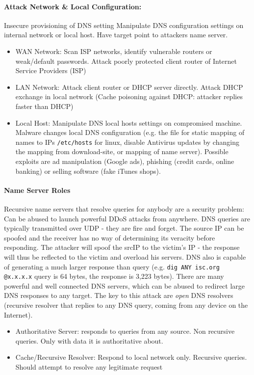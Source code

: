 \paragraph{Attack Network \& Local Configuration:} Insecure provisioning of DNS setting
Manipulate DNS configuration settings on internal network or local host. Have target point to attackers name server.
\begin{itemize}
    \item WAN Network: Scan ISP networks, identify vulnerable routers or weak/default passwords. Attack poorly protected client router of Internet Service Providers (ISP)
    \item LAN Network: Attack client router or DHCP server directly. Attack DHCP exchange in local network (Cache poisoning against DHCP: attacker replies faster than DHCP)
    \item Local Host: Manipulate DNS local hosts settings on compromised machine. Malware changes local DNS configuration (e.g. the file for static mapping of names to IPs \texttt{/etc/hosts} for linux, disable Antivirus updates by changing the mapping from download-site, or mapping of name server). Possible exploits are ad manipulation (Google ads), phishing (credit cards, online banking) or selling software (fake iTunes shops).
\end{itemize}

\paragraph{Name Server Roles}
Recursive name servers that resolve queries for anybody are a security problem:
Can be abused to launch powerful DDoS attacks from anywhere. DNS queries are typically transmitted over UDP - they are fire and forget. The source IP can be spoofed and the receiver has no way of determining its veracity before responding. The attacker will spoof the srcIP to the victim's IP - the response will thus be reflected to the victim and overload his servers. DNS also is capable of generating a much larger response than query (e.g. \texttt{dig ANY isc.org @x.x.x.x} query is 64 bytes, the response is 3,223 bytes). There are many powerful and well connected DNS servers, which can be abused to redirect large DNS responses to any target. The key to this attack are \textit{open} DNS resolvers (recursive resolver that replies to any DNS query, coming from any device
on the Internet).

\begin{itemize}
    \item Authoritative Server: responds to queries from any source. Non recursive queries. Only with data it is authoritative about.
    \item Cache/Recursive Resolver: Respond to local network only. Recursive queries. Should attempt to resolve any legitimate request
\end{itemize}

